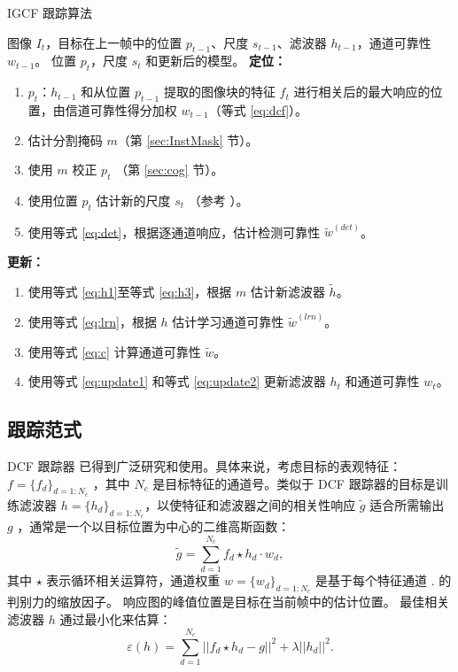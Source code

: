 \begin{algorithm}[t]
  \caption{IGCF 跟踪算法} 
  \begin{algorithmic}
    \Require 图像 $I_t$，目标在上一帧中的位置 $p_{t-1}$、尺度 $s_{t-1}$、滤波器 $h_{t-1}$，通道可靠性 $w_{t-1}$。
    \Ensure 位置 $p_t$，尺度 $s_t$ 和更新后的模型。
  \Statex
  \State \textbf{定位：}
  \begin{enumerate}[leftmargin=0pt,itemindent=1.5em]
    \item $p_t$：$h_{t-1}$ 和从位置 $p_{t-1}$ 提取的图像块的特征 $f_{t}$ 进行相关后的最大响应的位置，由信道可靠性得分加权 $w_{t-1}$（等式 \ref{eq:dcf}）。
    \item 估计分割掩码 $m$（第 \ref{sec:InstMask} 节）。
    \item 使用 $m$ 校正 $p_t$ （第 \ref{sec:cog} 节）。
    \item 使用位置 $p_t$ 估计新的尺度 $s_ t$ （参考 \cite{Danelljan2014AccurateSE}）。
    \item 使用等式 \ref{eq:det}，根据逐通道响应，估计检测可靠性 $\tilde{w}^{(det)}$。
  \end{enumerate}
  \State \textbf{更新：}
  \begin{enumerate}[leftmargin=0pt,itemindent=1.5em]
    \item 使用等式 \ref{eq:h1}至等式 \ref{eq:h3}，根据 $m$ 估计新滤波器 $\tilde{h}$。
    \item 使用等式 \ref{eq:lrn}，根据 $h$ 估计学习通道可靠性 $\tilde{w}^{(lrn)}$。
    \item 使用等式 \ref{eq:c} 计算通道可靠性 $\tilde{w}$。
    \item 使用等式 \ref{eq:update1} 和等式 \ref{eq:update2} 更新滤波器 $h_t$ 和通道可靠性 $w_t$。
  \end{enumerate}
\end{algorithmic}
\end{algorithm}

\subsection{跟踪范式}
DCF 跟踪器 \cite{Danelljan2014AccurateSE, henriques2014high-speed, Li2014ASA} 已得到广泛研究和使用。具体来说，考虑目标的表观特征：$f=\{f_d\}_{d=1:N_c}$ ，其中 $N_c$ 是目标特征的通道号。类似于 DCF 跟踪器的目标是训练滤波器 $h=\{h_d\}_{d=1:N_c}$，以使特征和滤波器之间的相关性响应 $\tilde{g}$ 适合所需输出 $g$ ，通常是一个以目标位置为中心的二维高斯函数： 
\begin{equation} \label{eq:dcf}
\tilde{g}=\sum_{d=1}^{N_c}f_d \star h_d \cdot w_d,
\end{equation}
其中 $\star$ 表示循环相关运算符，通道权重 $w = \{w_d\}_{d=1:N_c}$ 是基于每个特征通道 \cite{Lukezic2017DiscriminativeCF}.
的判别力的缩放因子。
响应图的峰值位置是目标在当前帧中的估计位置。
最佳相关滤波器 $h$ 通过最小化来估算：
\begin{equation}
\varepsilon(h) = \sum_{d=1}^{N_c}||f_d \star h_d - g||^2+\lambda||h_d||^2.
\end{equation}

